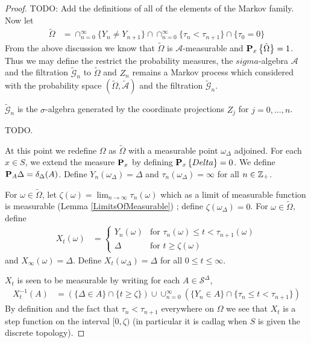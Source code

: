 \begin{proof}
TODO: Add the definitions of all of the elements of the Markov family.
Now let 
\begin{align*}
\tilde{\Omega} &= \cap_{n=0}^\infty \lbrace Y_n \neq Y_{n+1} \rbrace \cap \cap_{n=0}^\infty \lbrace \tau_n < \tau_{n+1} \rbrace \cap \lbrace \tau_0 = 0 \rbrace
\end{align*}
From the above discussion we know that $\tilde{\Omega}$ is $\mathcal{A}$-measurable and $\sprobability{\tilde{\Omega}}{x} = 1$.  Thus we may define the restrict the
probability measures, the $sigma$-algebra $\mathcal{A}$ and the filtration $\tilde{\mathcal{G}}_n$ to $\tilde{\Omega}$ and $Z_n$ remains a Markov process which considered with the probability space $(\tilde{\Omega}, \tilde{\mathcal{A}})$ and the filtration $\tilde{\mathcal{G}}_n$.

\begin{clm}$\tilde{\mathcal{G}}_n$ is the $\sigma$-algebra generated by the coordinate projections $Z_j$ for $j=0, \dotsc, n$.
\end{clm}
TODO.

At this point we redefine $\Omega$ as $\tilde{\Omega}$  with a measurable point $\omega_\Delta$ adjoined.  For each $x \in S$, we extend the measure $\probabilityop_x$ by defining $\sprobability{Delta}{x} = 0$.  We define $\sprobabilityop{A}{\Delta} = \delta_\Delta(A)$.  Define $Y_n(\omega_\Delta) = \Delta$ and $\tau_n(\omega_\Delta) = \infty$ for all $n \in \integers_+$.

For $\omega \in \tilde{\Omega}$, let $\zeta(\omega) = \lim_{n \to \infty} \tau_n(\omega)$ which as a limit of measurable function is measurable (Lemma \ref{LimitsOfMeasurable}) ; define $\zeta(\omega_\Delta) = 0$.   For $\omega \in \tilde{\Omega}$, define
\begin{align*}
X_t(\omega) &= \begin{cases}
Y_n(\omega)  & \text{for $\tau_n(\omega) \leq t < \tau_{n+1}(\omega)$} \\
\Delta & \text{for $t \geq \zeta(\omega)$}
\end{cases}
\end{align*}
and $X_\infty(\omega) = \Delta$.  Define $X_t(\omega_\Delta) = \Delta$ for all $0 \leq t \leq \infty$.

$X_t$ is seen to be measurable by writing for each $A \in \mathcal{S}^\Delta$,
\begin{align*}
X_t^{-1} (A) &= (\lbrace \Delta \in A \rbrace \cap \lbrace t \geq \zeta \rbrace) \cup \cup_{n=0}^\infty (\lbrace Y_n \in A \rbrace \cap \lbrace \tau_n \leq t < \tau_{n+1} \rbrace)
\end{align*}
By definition and the fact that $\tau_n < \tau_{n+1}$ everywhere on $\Omega$ we see that $X_t$ is a step function on the interval $[0, \zeta)$ (in particular it is cadlag when $S$ is given the discrete topology).


\end{proof}
